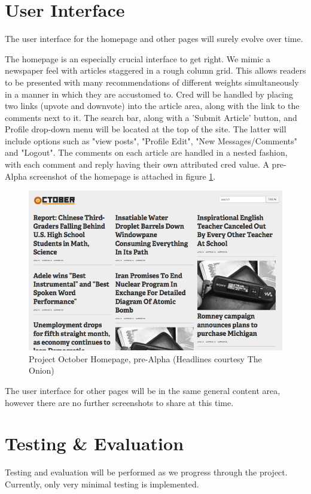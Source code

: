 \documentclass[11pt,letterpaper]{article}
\begin{document}
\section{User Interface}
The user interface for the homepage and other pages will surely evolve over time.

The homepage is an especially crucial interface to get right. We mimic a newspaper feel with articles staggered in a rough column grid.
This allows readers to be presented with many recommendations of different weights simultaneously in a manner in which they are accustomed to. 
Cred will be handled by placing two links (upvote and downvote) into the article area, along with the link to the comments next to it. 
The search bar, along with a 'Submit Article' button, and Profile drop-down menu will be located at the top of the site. The latter will include options such as "view posts", "Profile Edit", "New Messages/Comments" and "Logout".
The comments on each article are handled in a nested fashion, with each comment and reply having their own attributed cred value. 
A pre-Alpha screenshot of the homepage is attached in figure \ref{fig:homepage}.

\begin{figure}
\centering
\includegraphics[scale=0.35]{img/homepage.png}
\caption{Project October Homepage, pre-Alpha (Headlines courtesy The Onion)}
\label{fig:homepage}
\end{figure}

The user interface for other pages will be in the same general content area, however there are no further screenshots to share at this time.

\section{Testing \& Evaluation}
\label{sec:testing}
Testing and evaluation will be performed as we progress through the project. Currently, only very minimal testing is implemented.
\end{document}
